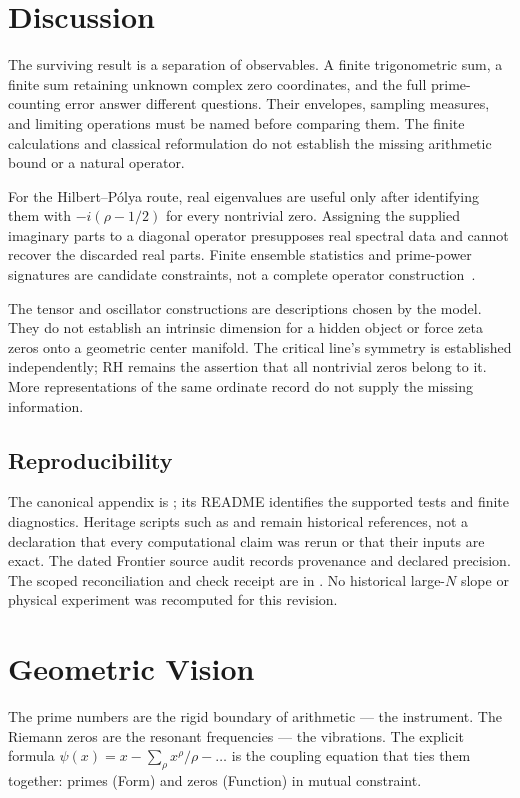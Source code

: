 \documentclass[11pt,a4paper]{article}
\theoremstyle{plain}
\theoremstyle{definition}
\theoremstyle{remark}
\begin{document}
\section{Discussion}
\label{sec:discussion}
The surviving result is a separation of observables. A finite trigonometric
sum, a finite sum retaining unknown complex zero coordinates, and the full
prime-counting error answer different questions. Their envelopes, sampling
measures, and limiting operations must be named before comparing them.
The finite calculations and classical reformulation do not establish the
missing arithmetic bound or a natural operator.

For the Hilbert--P\'olya route, real eigenvalues are useful only after
identifying them with $-i(\rho-1/2)$ for every nontrivial zero. Assigning
the supplied imaginary parts to a diagonal operator presupposes real
spectral data and cannot recover the discarded real parts. Finite ensemble
statistics and prime-power signatures are candidate constraints, not a
complete operator construction~\cite{BerryKeating1999,Connes1999}.

The tensor and oscillator constructions are descriptions chosen by the
model. They do not establish an intrinsic dimension for a hidden object
or force zeta zeros onto a geometric center manifold. The critical line's
symmetry is established independently; RH remains the assertion that all
nontrivial zeros belong to it. More representations of the same ordinate
record do not supply the missing information.

\subsection*{Reproducibility}
The canonical appendix is ; its README identifies
the supported tests and finite diagnostics. Heritage scripts such as
 and  remain historical
references, not a declaration that every computational claim was rerun or
that their inputs are exact. The dated Frontier source audit records
provenance and declared precision. The scoped reconciliation and check
receipt are in . No historical
large-$N$ slope or physical experiment was recomputed for this revision.

\appendix
\section{Geometric Vision}
\label{app:vision}
\noindent
The prime numbers are the rigid boundary of arithmetic ---
the instrument.  The Riemann zeros are the resonant frequencies ---
the vibrations.  The explicit formula $\psi(x) = x - \sum_\rho
x^\rho/\rho - \ldots$ is the coupling equation that ties them
together: primes (Form) and zeros (Function) in mutual constraint.
\end{document}
